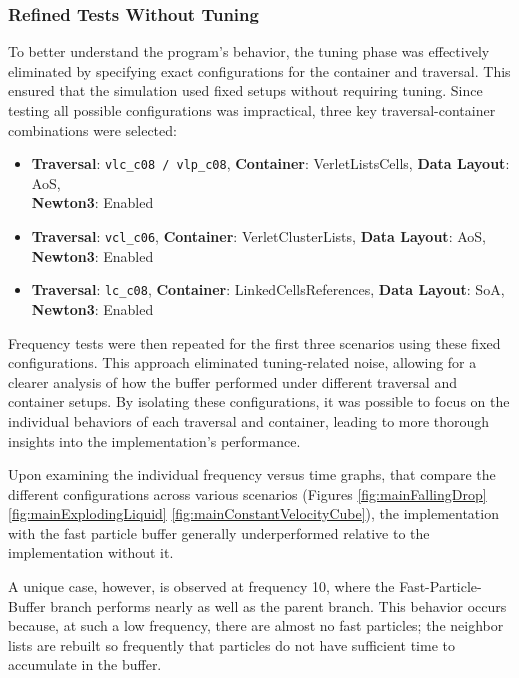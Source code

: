\subsubsection{Refined Tests Without Tuning}

To better understand the program's behavior, the tuning phase was effectively eliminated by specifying exact configurations for the container and traversal. This ensured that the simulation used fixed setups without requiring tuning. Since testing all possible configurations was impractical, three key traversal-container combinations were selected:


\begin{itemize}
    \item \textbf{Traversal}: \texttt{vlc\_c08 / vlp\_c08}, \textbf{Container}: VerletListsCells, \textbf{Data Layout}: AoS, \\ \textbf{Newton3}: Enabled
    \item \textbf{Traversal}: \texttt{vcl\_c06}, \textbf{Container}: VerletClusterLists, \textbf{Data Layout}: AoS, \\ \textbf{Newton3}: Enabled
    \item \textbf{Traversal}: \texttt{lc\_c08}, \textbf{Container}: LinkedCellsReferences, \textbf{Data Layout}: SoA, \\ \textbf{Newton3}: Enabled
\end{itemize}



Frequency tests were then repeated for the first three scenarios using these fixed configurations. This approach eliminated tuning-related noise, allowing for a clearer analysis of how the buffer performed under different traversal and container setups. By isolating these configurations, it was possible to focus on the individual behaviors of each traversal and container, leading to more thorough insights into the implementation's performance.

Upon examining the individual frequency versus time graphs, that compare the different configurations across various scenarios (Figures \ref{fig:mainFallingDrop} \ref{fig:mainExplodingLiquid} \ref{fig:mainConstantVelocityCube}), the implementation with the fast particle buffer generally underperformed relative to the implementation without it.

A unique case, however, is observed at frequency 10, where the Fast-Particle-Buffer branch performs nearly as well as the parent branch. This behavior occurs because, at such a low frequency, there are almost no fast particles; the neighbor lists are rebuilt so frequently that particles do not have sufficient time to accumulate in the buffer. 


